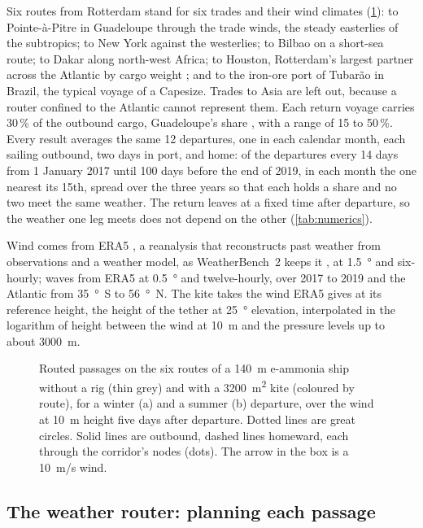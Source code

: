 Six routes from Rotterdam stand for six trades and their wind climates (\cref{fig:routes}): to Pointe-à-Pitre in Guadeloupe through the trade winds, the steady easterlies of the subtropics; to New York against the westerlies; to Bilbao on a short-sea route; to Dakar along north-west Africa; to Houston, Rotterdam's largest partner across the Atlantic by cargo weight \citep{eurostat_mar_go_am_nl}; and to the iron-ore port of Tubarão in Brazil, the typical voyage of a Capesize. Trades to Asia are left out, because a router confined to the Atlantic cannot represent them. Each return voyage carries 30\,\% of the outbound cargo, Guadeloupe's share \citep[p.~133]{iedom2025guadeloupe}, with a range of 15 to 50\,\%. Every result averages the same 12 departures, one in each calendar month, each sailing outbound, two days in port, and home: of the departures every 14 days from 1 January 2017 until 100 days before the end of 2019, in each month the one nearest its 15th, spread over the three years so that each holds a share and no two meet the same weather. The return leaves at a fixed time after departure, so the weather one leg meets does not depend on the other (\cref{tab:numerics}).

Wind comes from ERA5 \citep{hersbach2020}, a reanalysis that reconstructs past weather from observations and a weather model, as WeatherBench~2 keeps it \citep{rasp2024}, at \SI{1.5}{\degree} and six-hourly; waves from ERA5 at \SI{0.5}{\degree} and twelve-hourly, over 2017 to 2019 and the Atlantic from \SI{35}{\degree S} to \SI{56}{\degree N}. The kite takes the wind ERA5 gives at its reference height, the height of the tether at \SI{25}{\degree} elevation, interpolated in the logarithm of height between the wind at \SI{10}{m} and the pressure levels up to about \SI{3000}{m}.

\begin{figure}[tbp]
\centering
{}
\caption{ Routed passages on the six routes of a \SI{140}{m} e-ammonia ship without a rig (thin grey) and with a \SI{3200}{m^2} kite (coloured by route), for a winter (a) and a summer (b) departure, over the wind at \SI{10}{m} height five days after departure. Dotted lines are great circles. Solid lines are outbound, dashed lines homeward, each through the corridor's nodes (dots). The arrow in the box is a \SI{10}{m/s} wind.}
\label{fig:routes}
\end{figure}

\subsection{The weather router: planning each passage}
\label{sec:routing}


